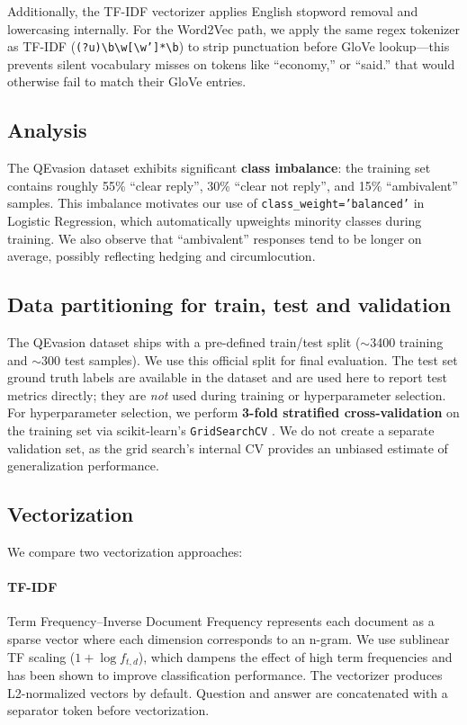 \documentclass[12pt]{fphw}
\begin{document}
Additionally, the TF-IDF vectorizer applies English stopword removal and lowercasing internally. For the Word2Vec path, we apply the same regex tokenizer as TF-IDF (\texttt{(?u)\textbackslash b\textbackslash w[\textbackslash w']*\textbackslash b}) to strip punctuation before GloVe lookup---this prevents silent vocabulary misses on tokens like ``economy,'' or ``said.'' that would otherwise fail to match their GloVe entries.

\subsection{Analysis}

The QEvasion dataset exhibits significant \textbf{class imbalance}: the training set contains roughly 55\% ``clear reply'', 30\% ``clear not reply'', and 15\% ``ambivalent'' samples. This imbalance motivates our use of \texttt{class\_weight='balanced'} in Logistic Regression, which automatically upweights minority classes during training. We also observe that ``ambivalent'' responses tend to be longer on average, possibly reflecting hedging and circumlocution.

\subsection{Data partitioning for train, test and validation}

The QEvasion dataset ships with a pre-defined train/test split ($\sim$3400 training and $\sim$300 test samples). We use this official split for final evaluation. The test set ground truth labels are available in the dataset and are used here to report test metrics directly; they are \emph{not} used during training or hyperparameter selection. For hyperparameter selection, we perform \textbf{3-fold stratified cross-validation} on the training set via scikit-learn's \texttt{GridSearchCV} \cite{sklearn}. We do not create a separate validation set, as the grid search's internal CV provides an unbiased estimate of generalization performance.

\subsection{Vectorization}

We compare two vectorization approaches:

\paragraph{TF-IDF} Term Frequency--Inverse Document Frequency \cite{tfidf} represents each document as a sparse vector where each dimension corresponds to an n-gram. We use sublinear TF scaling ($1 + \log f_{t,d}$), which dampens the effect of high term frequencies and has been shown to improve classification performance. The vectorizer produces L2-normalized vectors by default. Question and answer are concatenated with a separator token before vectorization.
\end{document}
